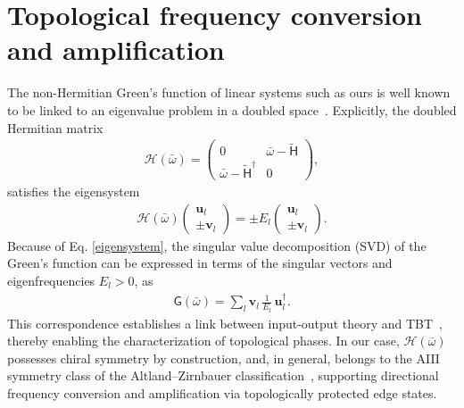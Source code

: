 \documentclass[a4paper,twocolumn,floatfix,10pt,superscriptaddress]%
{quantumarticle}
\newcommand{\mcrc}[1]{{\color{mcrcolor}{[MCR: #1]}}}
\newcommand{\msf}[1]{\mathsf{#1}}
\newcommand{\mcl}[1]{\mathcal{#1}}
\newcommand{\bsb}[1]{\boldsymbol{#1}}
\newcommand{\bomega}{{\bar{\omega}}}
\newcommand{\mcH}{{\mcl{H}}}
\newcommand{\msH}{{\msf{H}}}
\newcommand{\bu}{{\bsb{u}}}
\newcommand{\bv}{{\bsb{v}}}
\begin{document}
\section{Topological frequency conversion and amplification}
The non-Hermitian Green's function of linear systems such as ours is well known to be linked to an eigenvalue problem in a doubled space~\cite{Porras2019,Ramos2021,ClaveroRubio2025,Gomez2022,GomezLeon2023,Herviou2019}. Explicitly,  the doubled Hermitian matrix
\begin{align}\label{eq:doubled_matrix}
\mcH(\bomega) =
\begin{pmatrix}
0 & \bomega - \tilde{\msH} \\
\bomega - \tilde{\msH}^\dag & 0
\end{pmatrix},
\end{align} satisfies the eigensystem 
\begin{align}\label{eigensystem}
\mcH(\bomega)\begin{pmatrix}
        \bu_l\\ \pm \bv_l
    \end{pmatrix}=\pm E_l \begin{pmatrix}
        \bu_l\\ \pm \bv_l
    \end{pmatrix}.
\end{align}
Because of Eq. \ref{eigensystem}, the singular value decomposition (SVD) of the Green’s function can be expressed in terms of the singular vectors and eigenfrequencies $E_l>0$, as
\begin{eqnarray}
    \msf{G}(\bomega) = \sum_l \bv_l\, \frac{1}{E_l}\, \bu_l^\dag.
\end{eqnarray}
 This correspondence establishes a link between input-output theory and TBT~\cite{Ramos2021}, thereby enabling the characterization of topological phases. In our case, $\mcH(\bar{\omega})$ possesses chiral symmetry \mcrc{(${\cal S}\mcH(\bar{\omega}){\cal S} = -\mcH(\bar{\omega})$, with ${\cal S} = \mathbb{I}\otimes\sigma_z$)} by construction, and, in general, belongs to the AIII symmetry class of the Altland–Zirnbauer classification~\cite{Altland1997,Roy2017_FTI-classification}, supporting directional frequency conversion and amplification via topologically protected edge states.
\end{document}
